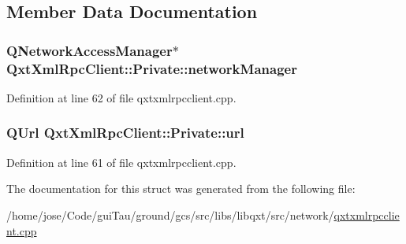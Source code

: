 \subsection{Member Data Documentation}
\hypertarget{struct_qxt_xml_rpc_client_1_1_private_a531e75f9bfc6e92ad31b96b35973385c}{
\subsubsection[{network\-Manager}]{\setlength{\rightskip}{0pt plus 5cm}Q\-Network\-Access\-Manager$\ast$ Qxt\-Xml\-Rpc\-Client\-::\-Private\-::network\-Manager}}\label{struct_qxt_xml_rpc_client_1_1_private_a531e75f9bfc6e92ad31b96b35973385c}


Definition at line 62 of file qxtxmlrpcclient.\-cpp.

\hypertarget{struct_qxt_xml_rpc_client_1_1_private_a737755a806dfde670c28cadc3f1cd229}{
\subsubsection[{url}]{\setlength{\rightskip}{0pt plus 5cm}Q\-Url Qxt\-Xml\-Rpc\-Client\-::\-Private\-::url}}\label{struct_qxt_xml_rpc_client_1_1_private_a737755a806dfde670c28cadc3f1cd229}


Definition at line 61 of file qxtxmlrpcclient.\-cpp.



The documentation for this struct was generated from the following file\-:\begin{DoxyCompactItemize}
\item 
/home/jose/\-Code/gui\-Tau/ground/gcs/src/libs/libqxt/src/network/\hyperlink{qxtxmlrpcclient_8cpp}{qxtxmlrpcclient.\-cpp}\end{DoxyCompactItemize}
